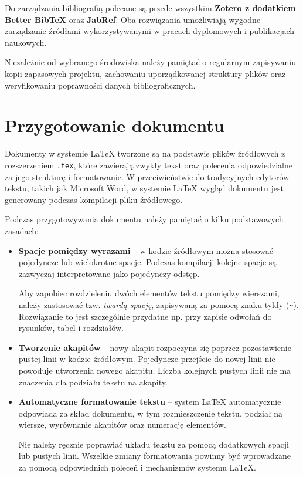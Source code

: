 Do zarządzania bibliografią polecane są przede wszystkim \textbf{Zotero z dodatkiem Better BibTeX} oraz \textbf{JabRef}. Oba rozwiązania umożliwiają wygodne zarządzanie źródłami wykorzystywanymi w pracach dyplomowych i publikacjach naukowych.

Niezależnie od wybranego środowiska należy pamiętać o regularnym zapisywaniu kopii zapasowych projektu, zachowaniu uporządkowanej struktury plików oraz weryfikowaniu poprawności danych bibliograficznych.


\section{Przygotowanie dokumentu}
\label{sec:przygotowanieDokumentu}

Dokumenty w systemie \LaTeX{} tworzone są na podstawie plików źródłowych z rozszerzeniem \texttt{.tex}, które zawierają zwykły tekst oraz polecenia odpowiedzialne za jego strukturę i formatowanie. W przeciwieństwie do tradycyjnych edytorów tekstu, takich jak Microsoft Word, w systemie \LaTeX{} wygląd dokumentu jest generowany  podczas kompilacji pliku źródłowego.

Podczas przygotowywania dokumentu należy pamiętać o kilku podstawowych zasadach:

\begin{itemize}

    \item \textbf{Spacje pomiędzy wyrazami} -- w kodzie źródłowym można stosować pojedyncze lub wielokrotne spacje. Podczas kompilacji kolejne spacje są zazwyczaj interpretowane jako pojedynczy odstęp.

    Aby zapobiec rozdzieleniu dwóch elementów tekstu pomiędzy wierszami, należy zastosować tzw. \textit{twardą spację}, zapisywaną za pomocą znaku tyldy (\texttt{\textasciitilde}). Rozwiązanie to jest szczególnie przydatne np. przy zapisie odwołań do rysunków, tabel i rozdziałów.

    \item \textbf{Tworzenie akapitów} -- nowy akapit rozpoczyna się poprzez pozostawienie pustej linii w kodzie źródłowym. Pojedyncze przejście do nowej linii nie powoduje utworzenia nowego akapitu. Liczba kolejnych pustych linii nie ma znaczenia dla podziału tekstu na akapity.

    \item \textbf{Automatyczne formatowanie tekstu} -- system \LaTeX{} automatycznie odpowiada za skład dokumentu,
    w tym rozmieszczenie tekstu, podział na wiersze, wyrównanie akapitów oraz numerację elementów.

    Nie należy ręcznie poprawiać układu tekstu za pomocą dodatkowych spacji lub pustych linii. Wszelkie zmiany formatowania powinny być wprowadzane za pomocą odpowiednich poleceń i mechanizmów systemu \LaTeX{}.

\end{itemize}

